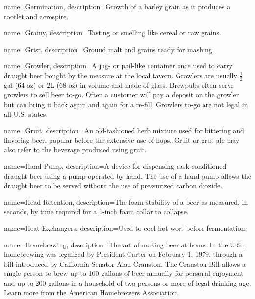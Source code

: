 {
  name={Germination},
  description={Growth of a barley grain as it produces a rootlet and acrospire.}
  }

{
  name={Grainy},
  description={Tasting or smelling like cereal or raw grains.}
  }

{
  name={Grist},
  description={Ground malt and grains ready for mashing.}
  }

{
  name={Growler},
  description={A jug- or pail-like container once used to carry draught beer bought by the measure at the local tavern. Growlers are usually $\frac{1}{2}$ gal (64 oz) or 2L (68 oz) in volume and made of glass. Brewpubs often serve growlers to sell beer to-go. Often a customer will pay a deposit on the growler but can bring it back again and again for a re-fill. Growlers to-go are not legal in all U.S. states.}
  }

{
  name={Gruit},
  description={An old-fashioned herb mixture used for bittering and flavoring beer, popular before the extensive use of hops. Gruit or grut ale may also refer to the beverage produced using gruit.}
  }

{
  name={Hand Pump},
  description={A device for dispensing cask conditioned draught beer using a pump operated by hand. The use of a hand pump allows the draught beer to be served without the use of pressurized carbon dioxide.}
  }

{
  name={Head Retention},
  description={The foam stability of a beer as measured, in seconds, by time required for a 1-inch foam collar to collapse.}
  }

{
  name={Heat Exchangers},
  description={Used to cool hot wort before fermentation.}
  }

{
  name={Homebrewing},
  description={The art of making beer at home. In the U.S., homebrewing was legalized by President Carter on February 1, 1979, through a bill introduced by California Senator Alan Cranston. The Cranston Bill allows a single person to brew up to 100 gallons of beer annually for personal enjoyment and up to 200 gallons in a household of two persons or more of legal drinking age. Learn more from the American Homebrewers Association.}
  }

